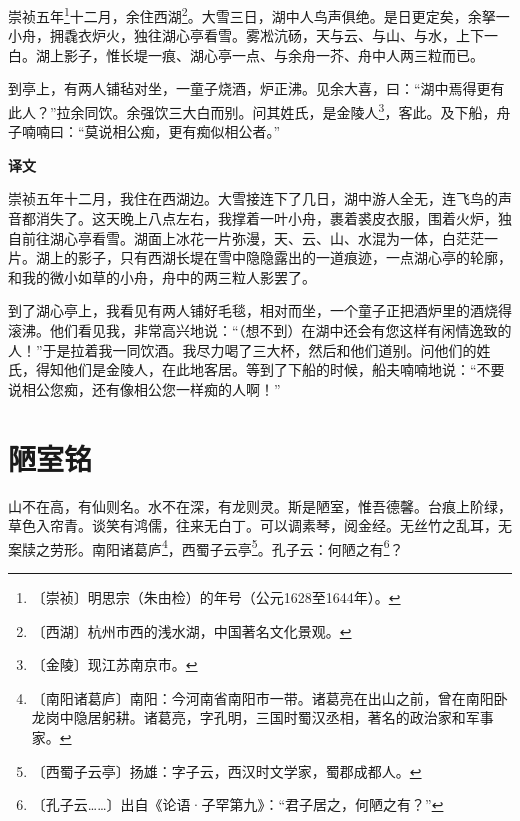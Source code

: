 \documentclass[12pt,UTF-8,openany,a4]{ctexbook}
\begin{document}
\begin{large}
    
    崇祯五年\footnote{〔崇祯〕\yiwen 明思宗（朱由检）的年号（公元1628至1644年）。}十二月，余住西湖\footnote{〔西湖〕\yiwen 杭州市西的浅水湖，中国著名文化景观。}。大雪三日，湖中人鸟声俱绝。是日更定矣，余拏一小舟，拥毳衣炉火，独往湖心亭看雪。雾凇沆砀，天与云、与山、与水，上下一白。湖上影子，惟长堤一痕、湖心亭一点、与余舟一芥、舟中人两三粒而已。
    
    到亭上，有两人铺毡对坐，一童子烧酒，炉正沸。见余大喜，曰：“湖中焉得更有此人？”拉余同饮。余强饮三大白而别。问其姓氏，是金陵人\footnote{〔金陵〕\yiwen 现江苏南京市。}，客此。及下船，舟子喃喃曰：“莫说相公痴，更有痴似相公者。”
\end{large}


\newpage

\begin{Large}
    \noindent\textbf{译文}
\end{Large}


\vspace{1em}

\begin{large}
    \yiwen 
    崇祯五年十二月，我住在西湖边。大雪接连下了几日，湖中游人全无，连飞鸟的声音都消失了。这天晚上八点左右，我撑着一叶小舟，裹着裘皮衣服，围着火炉，独自前往湖心亭看雪。湖面上冰花一片弥漫，天、云、山、水混为一体，白茫茫一片。湖上的影子，只有西湖长堤在雪中隐隐露出的一道痕迹，一点湖心亭的轮廓，和我的微小如草的小舟，舟中的两三粒人影罢了。
    
    到了湖心亭上，我看见有两人铺好毛毯，相对而坐，一个童子正把酒炉里的酒烧得滚沸。他们看见我，非常高兴地说：“（想不到）在湖中还会有您这样有闲情逸致的人！”于是拉着我一同饮酒。我尽力喝了三大杯，然后和他们道别。问他们的姓氏，得知他们是金陵人，在此地客居。等到了下船的时候，船夫喃喃地说：“不要说相公您痴，还有像相公您一样痴的人啊！”
    
\end{large}



\chapter{陋室铭}

\begin{large}
    
    山不在高，有仙则名。水不在深，有龙则灵。斯是陋室，惟吾德馨。台痕上阶绿，草色入帘青。谈笑有鸿儒，往来无白丁。可以调素琴，阅金经。无丝竹之乱耳，无案牍之劳形。南阳诸葛庐\footnote{〔南阳诸葛庐〕\yiwen 南阳：今河南省南阳市一带。诸葛亮在出山之前，曾在南阳卧龙岗中隐居躬耕。诸葛亮，字孔明，三国时蜀汉丞相，著名的政治家和军事家。}，西蜀子云亭\footnote{〔西蜀子云亭〕\yiwen 扬雄：字子云，西汉时文学家，蜀郡成都人。}。孔子云：何陋之有\footnote{〔孔子云……〕\yiwen 出自《论语·子罕第九》：“君子居之，何陋之有？”}？
\end{large}
\end{document}
